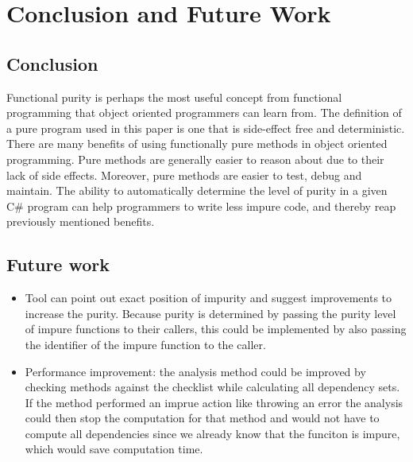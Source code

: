 \documentclass[a4paper,12pt]{article}
\begin{document}
\section{Conclusion and Future Work} \label{sec:Conclusion and future Work} %

\subsection{Conclusion} \label{sub:Conclusion}

Functional purity is perhaps the most useful concept from functional programming that object oriented programmers can learn from. The definition of a pure program used in this paper is one that is side-effect free and deterministic. There are many benefits of using functionally pure methods in object oriented programming. Pure methods are generally easier to reason about due to their lack of side effects. Moreover, pure methods are easier to test, debug and maintain. The ability to automatically determine the level of purity in a given C\# program can help programmers to write less impure code, and thereby reap previously mentioned benefits.

\subsection{Future work} \label{sub:Future work}

\begin{itemize}
  \item Tool can point out exact position of impurity and suggest improvements to increase the purity. Because purity is determined by passing the purity level of impure functions to their callers, this could be implemented by also passing the identifier of the impure function to the caller.
  \item Performance improvement: the analysis method could be improved by checking methods against the checklist while calculating all dependency sets. If the method performed an imprue action like throwing an error the analysis could then stop the computation for that method and would not have to compute all dependencies since we already know that the funciton is impure, which would save computation time.
\end{itemize}



\end{document}
